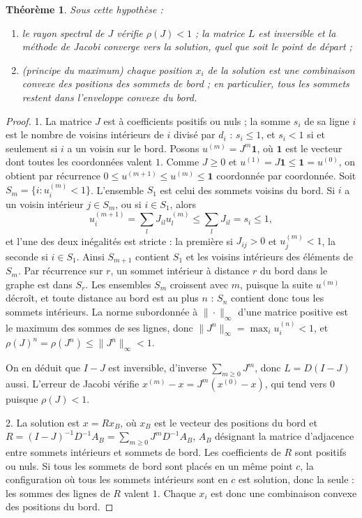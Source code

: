\documentclass[11pt,a4paper]{article}
\theoremstyle{plain}
\newtheorem{theoreme}{Théorème}[section]
\theoremstyle{definition}
\theoremstyle{remark}
\begin{document}
\begin{theoreme}\label{thm:laplacien}
Sous cette hypothèse :
\begin{enumerate}[nosep]
\item le rayon spectral de $J$ vérifie $\rho(J)<1$ ; la matrice $L$ est inversible et la méthode de Jacobi converge vers la solution, quel que soit le point de départ ;
\item (principe du maximum) chaque position $x_i$ de la solution est une combinaison convexe des positions des sommets de bord ; en particulier, tous les sommets restent dans l'enveloppe convexe du bord.
\end{enumerate}
\end{theoreme}

\begin{proof}
1. La matrice $J$ est à coefficients positifs ou nuls ; la somme $s_i$ de sa ligne $i$ est le nombre de voisins intérieurs de $i$ divisé par $d_i$ : $s_i\leq1$, et $s_i<1$ si et seulement si $i$ a un voisin sur le bord. Posons $u^{(m)}=J^m\mathbf 1$, où $\mathbf 1$ est le vecteur dont toutes les coordonnées valent $1$. Comme $J\geq0$ et $u^{(1)}=J\mathbf 1\leq\mathbf 1=u^{(0)}$, on obtient par récurrence $0\leq u^{(m+1)}\leq u^{(m)}\leq\mathbf 1$ coordonnée par coordonnée. Soit $S_m=\{i:u^{(m)}_i<1\}$. L'ensemble $S_1$ est celui des sommets voisins du bord. Si $i$ a un voisin intérieur $j\in S_m$, ou si $i\in S_1$, alors
\[
  u^{(m+1)}_i=\sum_lJ_{il}u^{(m)}_l\leq\sum_lJ_{il}=s_i\leq1,
\]
et l'une des deux inégalités est stricte : la première si $J_{ij}>0$ et $u^{(m)}_j<1$, la seconde si $i\in S_1$. Ainsi $S_{m+1}$ contient $S_1$ et les voisins intérieurs des éléments de $S_m$. Par récurrence sur $r$, un sommet intérieur à distance $r$ du bord dans le graphe est dans $S_r$. Les ensembles $S_m$ croissent avec $m$, puisque la suite $u^{(m)}$ décroît, et toute distance au bord est au plus $n$ : $S_n$ contient donc tous les sommets intérieurs. La norme subordonnée à $\|\cdot\|_\infty$ d'une matrice positive est le maximum des sommes de ses lignes, donc $\|J^n\|_\infty=\max_iu^{(n)}_i<1$, et $\rho(J)^n=\rho(J^n)\leq\|J^n\|_\infty<1$.

On en déduit que $I-J$ est inversible, d'inverse $\sum_{m\geq0}J^m$, donc $L=D(I-J)$ aussi. L'erreur de Jacobi vérifie $x^{(m)}-x=J^m(x^{(0)}-x)$, qui tend vers $0$ puisque $\rho(J)<1$.

2. La solution est $x=Rx_B$, où $x_B$ est le vecteur des positions du bord et $R=(I-J)^{-1}D^{-1}A_B=\sum_{m\geq0}J^mD^{-1}A_B$, $A_B$ désignant la matrice d'adjacence entre sommets intérieurs et sommets de bord. Les coefficients de $R$ sont positifs ou nuls. Si tous les sommets de bord sont placés en un même point $c$, la configuration où tous les sommets intérieurs sont en $c$ est solution, donc la seule : les sommes des lignes de $R$ valent $1$. Chaque $x_i$ est donc une combinaison convexe des positions du bord.
\end{proof}
\end{document}
